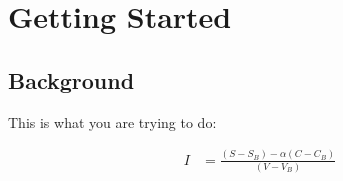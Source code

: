 \chapter{Getting Started}
\section{Background}

This is what you are trying to do:



\begin{equation} \label{eq_intensity}
\begin{split}
I & = \frac{(S - S_B)-\alpha (C-C_B)}{(V-V_B)} 
\end{split}
\end{equation}

